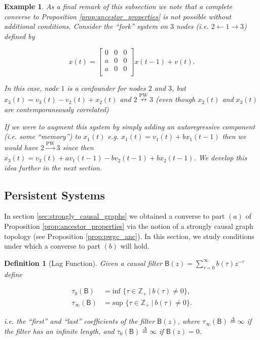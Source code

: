 \documentclass{statsoc}
\def\pwgc{\overset{\text{PW}}{\rightarrow}}  %
\def\npwgc{\overset{\text{PW}}{\nrightarrow}}  %
\def\B{\mathsf{B}}  %
\newtheorem{definition}{Definition}
\newtheorem{example}{Example}
\def\defeq{\overset{\Delta}{=}}  %
\def\Z{\mathbb{Z}}  %
\begin{document}
\begin{example}
  As a final remark of this subsection we note that a complete
  converse to Proposition \ref{prop:ancestor_properties} is not
  possible without additional conditions.  Consider the ``fork''
  system on $3$ nodes (i.e. $2 \leftarrow 1 \rightarrow 3$) defined by

  \begin{equation*}
    x(t) =
    \left[
      \begin{array}{cccc}
        0 & 0 & 0\\
        a & 0 & 0\\
        a & 0 & 0\\
      \end{array}
    \right] x(t - 1) + v(t).
  \end{equation*}

  In this case, node $1$ is a confounder for nodes $2$ and $3$, but
  $x_3(t) = v_3(t) - v_2(t) + x_2(t)$ and $2 \npwgc 3$ (even
  though $x_2(t)$ and $x_3(t)$ are contemporaneously correlated)

  If we were to augment this system by simply adding an autoregressive
  component (i.e. some ``memory'') to $x_1(t)$ e.g.
  $x_1(t) = v_1(t) + b x_1(t - 1)$ then we \textit{would} have
  $2 \pwgc 3$ since then
  $x_3(t) = v_3(t) + av_1(t - 1) - bv_2(t - 1) + bx_2(t - 1)$.  We
  develop this idea further in the next section.
\end{example}

\subsection{Persistent Systems}
\label{sec:persistent_systems}
In section \ref{sec:strongly_causal_graphs} we obtained a converse to
part $(a)$ of Proposition \ref{prop:ancestor_properties} via the
notion of a strongly causal graph topology (see Proposition
\ref{prop:pwgc_anc}).  In this section, we study conditions under
which a converse to part $(b)$ will hold.

\begin{definition}[Lag Function]
  Given a causal filter $\B(z) = \sum_{\tau = 0}^\infty b(\tau)z^{-\tau}$
  define 

  \begin{align}
    \tau_0(\B) &= \text{inf }\{\tau \in \Z_+\ |\ b(\tau) \ne 0\},\\
    \tau_{\infty}(\B) &= \text{sup }\{\tau \in \Z_+\ |\ b(\tau) \ne 0\}.
  \end{align}

  i.e. the ``first'' and ``last'' coefficients of the filter $\B(z)$,
  where $\tau_\infty(\B) \defeq \infty$ if the filter has an infinite
  length, and $\tau_0(\B) \defeq \infty$ if $\B(z) = 0$.
\end{definition}
\end{document}
